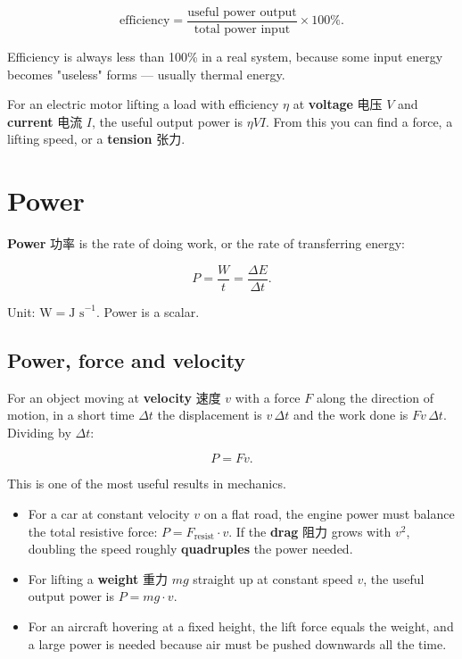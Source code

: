 \documentclass[11pt]{article}
\begin{document}
\[
\text{efficiency} = \frac{\text{useful power output}}{\text{total power input}} \times 100\%.
\]

Efficiency is always less than 100\% in a real system, because some input energy becomes "useless" forms — usually thermal energy.

For an electric motor lifting a load with efficiency $\eta$ at \textbf{voltage} 电压 $V$ and \textbf{current} 电流 $I$, the useful output power is $\eta V I$. From this you can find a force, a lifting speed, or a \textbf{tension} 张力.

\section*{Power}

\textbf{Power} 功率 is the rate of doing work, or the rate of transferring energy:

\[
P = \frac{W}{t} = \frac{\Delta E}{\Delta t}.
\]

Unit: $\text{W} = \text{J s}^{-1}$. Power is a scalar.

\subsection*{Power, force and velocity}

For an object moving at \textbf{velocity} 速度 $v$ with a force $F$ along the direction of motion, in a short time $\Delta t$ the displacement is $v\,\Delta t$ and the work done is $F v\,\Delta t$. Dividing by $\Delta t$:

\[
P = F v.
\]

This is one of the most useful results in mechanics.

\begin{itemize}
\item For a car at constant velocity $v$ on a flat road, the engine power must balance the total resistive force: $P = F_{\text{resist}} \cdot v$. If the \textbf{drag} 阻力 grows with $v^{2}$, doubling the speed roughly \textbf{quadruples} the power needed.

\item For lifting a \textbf{weight} 重力 $mg$ straight up at constant speed $v$, the useful output power is $P = mg \cdot v$.

\item For an aircraft hovering at a fixed height, the lift force equals the weight, and a large power is needed because air must be pushed downwards all the time.

\end{itemize}
\end{document}

